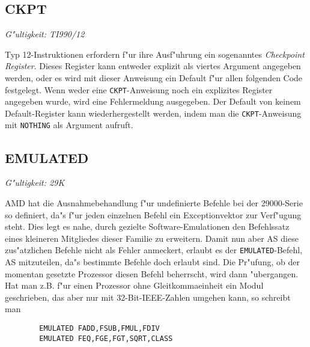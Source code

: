 \documentclass[12pt,a4paper,twoside]{report}
\makeatletter
\newcommand{\tty}[1]{{\tt #1}}
\newcommand{\ttindex}[1]{\index{#1@{\tt #1}}}
\makeatother
\begin{document}

\subsection{CKPT}
\ttindex{CKPT}

{\em G"ultigkeit: TI990/12}

Typ 12-Instruktionen erfordern f"ur ihre Ausf"uhrung ein sogenanntes {\em Checkpoint
Register}.  Dieses Register kann entweder explizit als viertes Argument angegeben
werden, oder es wird mit dieser Anweisung ein Default f"ur allen folgenden Code
festgelegt.  Wenn weder eine \tty{CKPT}-Anweisung noch ein explizites Register
angegeben wurde, wird eine Fehlermeldung ausgegeben. Der Default von keinem
Default-Register kann wiederhergestellt werden, indem man die \tty{CKPT}-Anweisung
mit {\tt NOTHING} als Argument aufruft.


\subsection{EMULATED}
\ttindex{EMULATED}

{\em G"ultigkeit: 29K}

AMD hat die Ausnahmebehandlung f"ur undefinierte Befehle bei der
29000-Serie so definiert, da"s f"ur jeden einzelnen Befehl ein
Exceptionvektor zur Verf"ugung steht.  Dies legt es nahe, durch
gezielte Software-Emulationen den Befehlssatz eines kleineren
Mitgliedes dieser Familie zu erweitern.  Damit nun aber AS diese
zus"atzlichen Befehle nicht als Fehler anmeckert, erlaubt es der
\tty{EMULATED}-Befehl, AS mitzuteilen, da"s bestimmte Befehle doch
erlaubt sind.  Die Pr"ufung, ob der momentan gesetzte Prozessor
diesen Befehl beherrscht, wird dann "ubergangen.  Hat man z.B. f"ur
einen Prozessor ohne Gleitkommaeinheit ein Modul geschrieben, das
aber nur mit 32-Bit-IEEE-Zahlen umgehen kann, so schreibt man
\begin{verbatim}
        EMULATED FADD,FSUB,FMUL,FDIV
        EMULATED FEQ,FGE,FGT,SQRT,CLASS
\end{verbatim}
\end{document}

